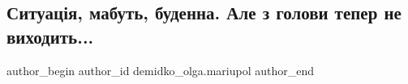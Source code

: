  
 
 
 
 

\subsection{Ситуація, мабуть, буденна. Але з голови тепер не виходить...}
\label{sec:15_04_2023.fb.demidko_olga.mariupol.1.sytuacia_symvolika}

\ifcmt
 author_begin
   author_id demidko_olga.mariupol
 author_end
\fi

